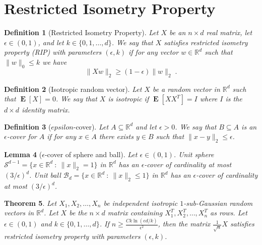 \documentclass[12pt]{article}
\newtheorem{definition}{Definition}
\newtheorem{lemma}[definition]{Lemma}
\newtheorem{theorem}[definition]{Theorem}
\newcommand{\R}{\mathbb{R}}
\newcommand{\norm}[1]{\|{#1}\|}
\renewcommand{\S}{\mathcal{S}}
\newcommand{\B}{\mathcal{B}}
\DeclareMathOperator*{\Exp}{\mathbf{E}}
\begin{document}
\section{Restricted Isometry Property}

\begin{definition}[Restricted Isometry Property]
Let $X$ be an $n \times d$ real matrix, let $\epsilon \in (0,1)$, and let $k \in
\{0,1,\dots,d\}$. We say that $X$ satisfies \emph{restricted isometry property
(RIP) with parameters $(\epsilon, k)$} if for any vector $w \in \R^d$ such that
$\norm{w}_0 \le k$ we have
$$
\norm{X w}_2 \ge (1 - \epsilon) \norm{w}_2 \; .
$$
\end{definition}

\begin{definition}[Isotropic random vector]
Let $X$ be a random vector in $\R^d$ such that $\Exp[X] = 0$.
We say that $X$ is \emph{isotropic} if $\Exp[X X^T] = I$ where $I$
is the $d \times d$ identity matrix.
\end{definition}

\begin{definition}[$epsilon$-cover]
Let $A \subseteq \R^d$ and let $\epsilon > 0$. We say that
$B \subseteq A$ is an \emph{$\epsilon$-cover for $A$} if for any $x \in A$
there exists $y \in B$ such that $\norm{x-y}_2 \le \epsilon$.
\end{definition}

\begin{lemma}[$\epsilon$-cover of sphere and ball]
Let $\epsilon \in (0,1)$.
Unit sphere $\S^{d-1} = \{ x \in \R^d ~:~ \norm{x}_2 = 1 \}$ in $\R^d$
has an $\epsilon$-cover of cardinality at most $(3/\epsilon)^d$.
Unit ball $\B_d = \{ x \in \R^d ~:~ \norm{x}_2 \le 1 \}$ in $\R^d$
has an $\epsilon$-cover of cardinality at most $(3/\epsilon)^d$.
\end{lemma}

\begin{theorem}
Let $X_1, X_2, \dots, X_n$ be independent isotropic $1$-sub-Gaussian random
vectors in $\R^d$. Let $X$ be the $n \times d$ matrix containing $X_1^T, X_2^T,
\dots, X_n^T$ as rows. Let $\epsilon \in (0,1)$ and $k \in \{0,1,\dots,d\}$. If
$n \ge \frac{C k \ln(ed/k)}{\epsilon^2}$, then the matrix $\frac{1}{\sqrt{n}}X$
satisfies restricted isometry property with parameters $(\epsilon, k)$.
\end{theorem}
\end{document}
